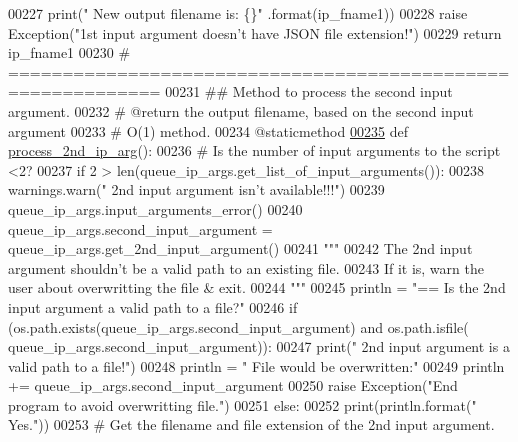 \begin{DoxyCode}
00227             print(\textcolor{stringliteral}{" New output filename is: \{\}"} .format(ip\_fname1))
00228             \textcolor{keywordflow}{raise} Exception(\textcolor{stringliteral}{"1st input argument doesn't have JSON file extension!"})
00229         \textcolor{keywordflow}{return} ip\_fname1
00230     \textcolor{comment}{# ============================================================}
00231     \textcolor{comment}{##  Method to process the second input argument.}
00232     \textcolor{comment}{#   @return the output filename, based on the second input argument}
00233     \textcolor{comment}{#   O(1) method.}
00234     @staticmethod
\hypertarget{queue__ip__arguments_8py_source_l00235}{}\hyperlink{classutilities_1_1queue__ip__arguments_1_1queue__ip__args_a82d245379c48196f61d4268882dd5c6d}{00235}     \textcolor{keyword}{def }\hyperlink{classutilities_1_1queue__ip__arguments_1_1queue__ip__args_a82d245379c48196f61d4268882dd5c6d}{process\_2nd\_ip\_arg}():
00236         \textcolor{comment}{#   Is the number of input arguments to the script <2?}
00237         \textcolor{keywordflow}{if} 2 > len(queue\_ip\_args.get\_list\_of\_input\_arguments()):
00238             warnings.warn(\textcolor{stringliteral}{" 2nd input argument isn't available!!!"})
00239             queue\_ip\_args.input\_arguments\_error()
00240         queue\_ip\_args.second\_input\_argument = queue\_ip\_args.get\_2nd\_input\_argument()
00241         \textcolor{stringliteral}{"""}
00242 \textcolor{stringliteral}{        The 2nd input argument shouldn't be a valid path to an existing file.}
00243 \textcolor{stringliteral}{        If it is, warn the user about overwritting the file & exit.}
00244 \textcolor{stringliteral}{        """}
00245         println = \textcolor{stringliteral}{"==   Is the 2nd input argument a valid path to a file?"}
00246         \textcolor{keywordflow}{if} (os.path.exists(queue\_ip\_args.second\_input\_argument) \textcolor{keywordflow}{and} os.path.isfile(
      queue\_ip\_args.second\_input\_argument)):
00247             print(\textcolor{stringliteral}{" 2nd input argument is a valid path to a file!"})
00248             println = \textcolor{stringliteral}{" File would be overwritten:"}
00249             println += queue\_ip\_args.second\_input\_argument
00250             \textcolor{keywordflow}{raise} Exception(\textcolor{stringliteral}{"End program to avoid overwritting file."})
00251         \textcolor{keywordflow}{else}:
00252             print(println.format(\textcolor{stringliteral}{"  Yes."}))
00253         \textcolor{comment}{#   Get the filename and file extension of the 2nd input argument.}

\end{DoxyCode}
